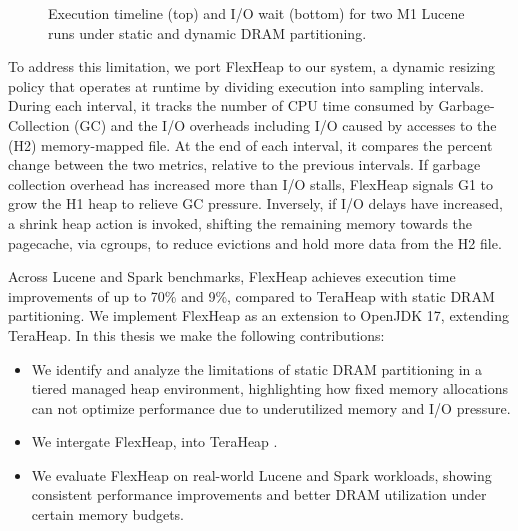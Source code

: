 \begin{figure}[!t]
    \caption{Execution timeline (top) and I/O wait (bottom) for two M1 Lucene runs under static and dynamic DRAM partitioning.}
    \label{fig:lucene_m1}
\end{figure}

To address this limitation, we port FlexHeap \cite{flexheap} to our system, a dynamic
resizing policy that operates at runtime by dividing execution into sampling
intervals. During each interval, it tracks the number of CPU time consumed by Garbage-Collection (GC)
and the I/O overheads including I/O caused by accesses to
the (H2) memory-mapped file. At the end of each interval, it compares the
percent change between the two metrics, relative to the previous intervals. If
garbage collection overhead has increased more than I/O stalls, FlexHeap
signals G1 to grow the H1 heap to relieve GC pressure. Inversely, if I/O delays
have increased, a shrink heap action is invoked, shifting the remaining memory
towards the pagecache, via cgroups, to reduce evictions and hold more data from
the H2 file.

Across Lucene and Spark benchmarks, FlexHeap achieves 
execution time improvements of up to 70\% and 9\%, compared to 
TeraHeap with static DRAM partitioning. We implement FlexHeap as an extension 
to OpenJDK 17, extending TeraHeap.
In this thesis we make the following contributions:

\vspace{0.5em}
\begin{itemize}
\item We identify and analyze the limitations of static DRAM partitioning in a tiered managed heap 
  environment, highlighting how fixed memory allocations can not optimize performance 
  due to underutilized memory and I/O pressure.

\item We intergate FlexHeap, into TeraHeap \cite{melidonis_thesis, mairh_thesis}.

\item We evaluate FlexHeap on real-world Lucene and Spark workloads, showing consistent
  performance improvements and better DRAM utilization under certain memory budgets.

\end{itemize}
